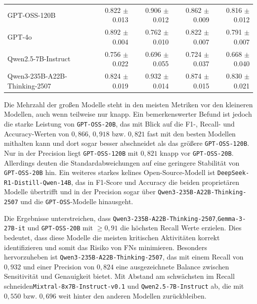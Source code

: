 \begin{table}[htbp]
\begin{adjustbox}{width=\textwidth}
\begin{tabular}{l r r r r}
            GPT-OSS-120B                    & 0.822 $\pm$ 0.013 & 0.906 $\pm$ 0.012 & 0.862 $\pm$ 0.009 & 0.816 $\pm$ 0.012 \\
            GPT-4o                          & 0.892 $\pm$ 0.004 & 0.762 $\pm$ 0.010 & 0.822 $\pm$ 0.007 & 0.791 $\pm$ 0.007 \\
            Qwen2.5-7B-Instruct             & 0.756 $\pm$ 0.022 & 0.696 $\pm$ 0.055 & 0.724 $\pm$ 0.037 & 0.668 $\pm$ 0.040 \\
            Qwen3-235B-A22B-Thinking-2507   & 0.824 $\pm$ 0.019 & 0.932 $\pm$ 0.014 & 0.874 $\pm$ 0.015 & 0.830 $\pm$ 0.021 \\
            \bottomrule
        \end{tabular}
    \end{adjustbox}
\end{table}

Die Mehrzahl der großen Modelle steht in den meisten Metriken vor den kleineren Modellen, auch wenn teilweise nur knapp. Ein bemerkenswerter Befund ist jedoch die starke Leistung von \texttt{GPT-OSS-20B}, das mit Blick auf die F1-, Recall- und Accuracy-Werten von $0{,}866$, $0{,}918$ bzw. $0{,}821$ fast mit den besten Modellen mithalten kann und dort sogar besser abschneidet als das größere \texttt{GPT-OSS-120B}. Nur in der Precision liegt \texttt{GPT-OSS-120B} mit $0{,}821$ knapp vor \texttt{GPT-OSS-20B}. Allerdings deuten die Standardabweichungen auf eine geringere Stabilität von \texttt{GPT-OSS-20B} hin. Ein weiteres starkes kelines Open-Source-Modell ist \texttt{DeepSeek-R1-Distill\linebreak-Qwen-14B}, das in F1-Score und Accuracy die
beiden proprietären Modelle übertrifft und in der Precision sogar über \texttt{Qwen3-235B-A22B-Thinking-2507} und die \texttt{GPT-OSS}-Modelle hinausgeht.

Die Ergebnisse unterstreichen, dass \texttt{Qwen3-235B-A22B-Thinking-2507},\linebreak\texttt{Gemma-3-27B-it} und \texttt{GPT-OSS-20B} mit $\geq 0{,}91$ die höchsten Recall Werte erzielen. Dies bedeutet, dass diese Modelle die meisten kritischen Aktivitäten korrekt identifizieren und somit das Risiko von \acp{FN} minimieren. Besonders hervorzuheben ist \texttt{Qwen3-235B-A22B-Thinking-2507}, das mit einem Recall von $0{,}932$ und einer Precision von $0{,}824$ eine ausgezeichnete Balance zwischen Sensitivität und Genauigkeit bietet. Mit Abstand am schwächsten im Recall schneiden\linebreak\texttt{Mixtral-8x7B-Instruct-v0.1} und \texttt{Qwen2.5-7B-Instruct} ab, die mit $0{,}550$ bzw. $0{,}696$ weit hinter den anderen Modellen zurückbleiben.


